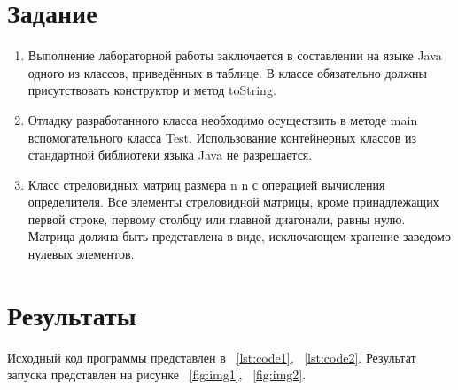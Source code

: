 \documentclass[a4paper, 14pt]{extarticle}
\begin{document}
\renewcommand{\ttdefault}{pcr}

\setlength{\tabcolsep}{3pt}
\newpage
\setcounter{page}{2}

\section{Задание}\label{Sect::task}
\begin{enumerate}
\item Выполнение лабораторной работы заключается в составлении на языке Java одного из
классов, приведённых в таблице. В классе обязательно должны присутствовать конструктор и метод toString.


\item Отладку разработанного класса необходимо осуществить в методе main
вспомогательного класса Test. Использование контейнерных классов из стандартной библиотеки языка Java не разрешается.

\item Класс стреловидных матриц размера n n с операцией вычисления определителя. Все элементы стреловидной матрицы, кроме принадлежащих первой строке, первому столбцу или главной диагонали, равны нулю. Матрица должна быть представлена в виде, исключающем хранение заведомо нулевых элементов.


\end{enumerate}
\section{Результаты}\label{Sect::res}

Исходный код программы представлен в ~\ref{lst:code1}, ~\ref{lst:code2}.
Результат запуска представлен на рисунке ~\ref{fig:img1}, ~\ref{fig:img2}.
\end{document}
